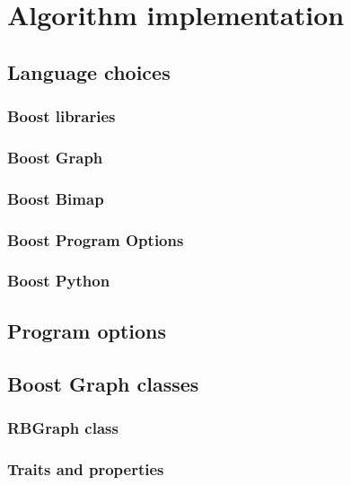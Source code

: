 
\section{Algorithm implementation}\label{section:implementation}

\subsection{Language choices}\label{section:language-choices}

\subsubsection{Boost libraries}\label{section:boost-libs}

\subsubsection*{Boost Graph}

\subsubsection*{Boost Bimap}

\subsubsection*{Boost Program Options}

\subsubsection*{Boost Python}

\subsection{Program options}\label{section:program-options}

\subsection{Boost Graph classes}\label{section:graph-classes}

\subsubsection{RBGraph class}\label{section:rbgraph-class}

\subsubsection*{Traits and properties}

